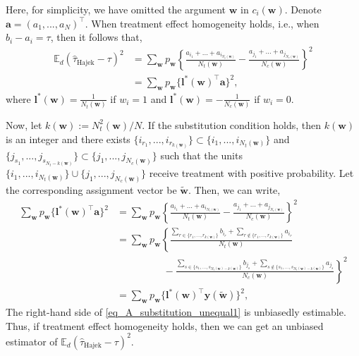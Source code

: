 \documentclass[12pt]{article}
\newcommand{\E}{{\mathbb{E}}}
\begin{document}
Here, for simplicity, we have omitted the argument $\bm{w}$ in $c_i(\bm{w})$. Denote $\bm{a} = (a_1,...,a_N)^\top$.
When treatment effect homogeneity holds, i.e., when $b_i - a_i = \tau$, then it follows that, 
\begin{align}
    \E_d(\hat{\tau}_{\text{Hajek}} - \tau)^2 &= \sum_{\bm{w}} p_{\bm{w}} \left\{\frac{a_{i_1} + ... + a_{i_{N_t(\bm{w})}}}{N_t(\bm{w})} - \frac{a_{j_1} + ... + a_{j_{N_c(\bm{w})}}}{N_c(\bm{w})}\right\}^2 \nonumber \\
    & = \sum_{\bm{w}} p_{\bm{w}} \{\bm{l}^*(\bm{w})^\top\bm{a}\}^2,
\end{align}
where $\bm{l}^*(\bm{w}) = \frac{1}{N_t(\bm{w})}$ if $w_i = 1$ and $\bm{l}^*(\bm{w}) = -\frac{1}{N_c(\bm{w})}$ if $w_i = 0$. 

Now, let $k(\bm{w}) := N^2_t(\bm{w})/N$. If the substitution condition holds, then $k(\bm{w})$ is an integer and there exists $\{i_{r_1},...,i_{r_{k(\bm{w})}}\} \subset \{i_1,...,i_{N_t(\bm{w})}\}$ and $\{j_{s_1},...,j_{s_{N_t - k(\bm{w})}} \} \subset \{j_1,...,j_{N_c(\bm{w})}\}$ such that the units $\{i_1,...,i_{N_t(\bm{w})}\} \cup \{j_1,...,j_{N_c(\bm{w})}\}$ receive treatment with positive probability. Let the corresponding assignment vector be $\tilde{\bm{w}}$. Then, we can write,
\begin{align}
\sum_{\bm{w}} p_{\bm{w}} \{\bm{l}^*(\bm{w})^\top\bm{a}\}^2 &= \sum_{\bm{w}} p_{\bm{w}} \left\{\frac{a_{i_1} + ... + a_{i_{N_t(\bm{w})}}}{N_t(\bm{w})} - \frac{a_{j_1} + ... + a_{j_{N_c(\bm{w})}}}{N_c(\bm{w})}\right\}^2 \nonumber \\
& = \sum_{\bm{w}} p_{\bm{w}} \left\{\frac{\sum_{r \in \{r_1,...,r_{k(\bm{w})}\}}b_{i_r} + \sum_{r \notin \{r_1,...,r_{k(\bm{w})}\}}a_{i_r}}{N_t(\bm{w})} \right. \nonumber \\
& \hspace{2cm}- \left. \frac{\sum_{s \in \{s_1,...,s_{N_t(\bm{w})- k(\bm{w})}\}}b_{j_s} + \sum_{s \notin \{s_1,...,s_{N_t(\bm{w}) - k(\bm{w})}\}}a_{j_s}}{N_c(\bm{w})}   \right\}^2  \nonumber\\
& = \sum_{\bm{w}} p_{\bm{w}} \{\bm{l}^*(\bm{w})^\top \bm{y}(\tilde{\bm{w}})\}^2,
\label{eq_A_substitution_unequal1}
\end{align}
The right-hand side of \ref{eq_A_substitution_unequal1} is unbiasedly estimable. Thus, if treatment effect homogeneity holds, then we can get an unbiased estimator of $\E_d(\hat{\tau}_{\text{Hajek}} - \tau)^2$.
\end{document}
